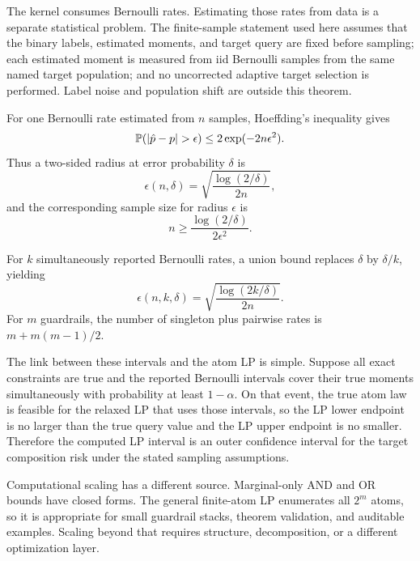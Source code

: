 The kernel consumes Bernoulli rates. Estimating those rates from data is a
separate statistical problem. The finite-sample statement used here assumes
that the binary labels, estimated moments, and target query are fixed before
sampling; each estimated moment is measured from iid Bernoulli samples from the
same named target population; and no uncorrected adaptive target selection is
performed. Label noise and population shift are outside this theorem.

For one Bernoulli rate estimated from $n$ samples, Hoeffding's inequality gives
\[
  \mathbb{P}(|\hat p-p| > \epsilon) \le 2\exp(-2n\epsilon^2).
\]
Thus a two-sided radius at error probability $\delta$ is
\[
  \epsilon(n,\delta) = \sqrt{\frac{\log(2/\delta)}{2n}},
\]
and the corresponding sample size for radius $\epsilon$ is
\[
  n \ge \frac{\log(2/\delta)}{2\epsilon^2}.
\]

For $k$ simultaneously reported Bernoulli rates, a union bound replaces
$\delta$ by $\delta/k$, yielding
\[
  \epsilon(n,k,\delta) =
  \sqrt{\frac{\log(2k/\delta)}{2n}}.
\]
For $m$ guardrails, the number of singleton plus pairwise rates is
$m + m(m-1)/2$.

The link between these intervals and the atom LP is simple. Suppose all exact
constraints are true and the reported Bernoulli intervals cover their true
moments simultaneously with probability at least $1-\alpha$. On that event, the
true atom law is feasible for the relaxed LP that uses those intervals, so the
LP lower endpoint is no larger than the true query value and the LP upper
endpoint is no smaller. Therefore the computed LP interval is an outer
confidence interval for the target composition risk under the stated sampling
assumptions.

Computational scaling has a different source. Marginal-only AND and OR bounds
have closed forms. The general finite-atom LP enumerates all $2^m$ atoms, so it
is appropriate for small guardrail stacks, theorem validation, and auditable
examples. Scaling beyond that requires structure, decomposition, or a different
optimization layer.
